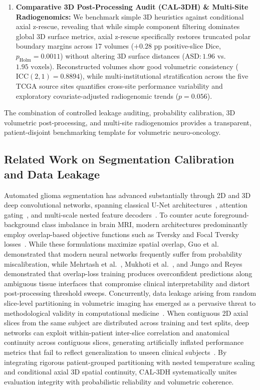 \documentclass[11pt,a4paper]{article}
\begin{document}
\begin{enumerate}
    \item \textbf{Comparative 3D Post-Processing Audit (CAL-3DH) \& Multi-Site Radiogenomics:} We benchmark simple 3D heuristics against conditional axial z-rescue, revealing that while simple component filtering dominates global 3D surface metrics, axial z-rescue specifically restores truncated polar boundary margins across 17 volumes ($+0.28\text{ pp}$ positive-slice Dice, $p_{\text{Holm}} = 0.0011$) without altering 3D surface distances ($\text{ASD}: 1.96$ vs.\ $1.95\text{ voxels}$). Reconstructed volumes show good volumetric consistency ($\text{ICC}(2,1) = 0.8894$), while multi-institutional stratification across the five TCGA source sites quantifies cross-site performance variability and exploratory covariate-adjusted radiogenomic trends ($p = 0.056$).
\end{enumerate}

The combination of controlled leakage auditing, probability calibration, 3D volumetric post-processing, and multi-site radiogenomics provides a transparent, patient-disjoint benchmarking template for volumetric neuro-oncology.

\subsection{Related Work on Segmentation Calibration and Data Leakage}
\label{sec:related_work}
Automated glioma segmentation has advanced substantially through 2D and 3D deep convolutional networks, spanning classical U-Net architectures~\cite{ronneberger2015u,buda2019association}, attention gating~\cite{oktay2018attention}, and multi-scale nested feature decoders~\cite{zhou2018unetplusplus}. To counter acute foreground-background class imbalance in brain MRI, modern architectures predominantly employ overlap-based objective functions such as Tversky and Focal Tversky losses~\cite{salehi2017tversky,abraham2019novel}. While these formulations maximize spatial overlap, Guo et al.~\cite{guo2017calibration} demonstrated that modern neural networks frequently suffer from probability miscalibration, while Mehrtash et al.~\cite{mehrtash2020confidence}, Mukhoti et al.~\cite{mukhoti2020calibrating}, and Jungo and Reyes~\cite{jungo2019assessing} demonstrated that overlap-loss training produces overconfident predictions along ambiguous tissue interfaces that compromise clinical interpretability and distort post-processing threshold sweeps. Concurrently, data leakage arising from random slice-level partitioning in volumetric imaging has emerged as a pervasive threat to methodological validity in computational medicine~\cite{wen2020convolutional}. When contiguous 2D axial slices from the same subject are distributed across training and test splits, deep networks can exploit within-patient inter-slice correlation and anatomical continuity across contiguous slices, generating artificially inflated performance metrics that fail to reflect generalization to unseen clinical subjects~\cite{kapoor2023leakage,varoquaux2022machine,yagis2021effect}. By integrating rigorous patient-grouped partitioning with nested temperature scaling and conditional axial 3D spatial continuity, CAL-3DH systematically unites evaluation integrity with probabilistic reliability and volumetric coherence.
\end{document}
